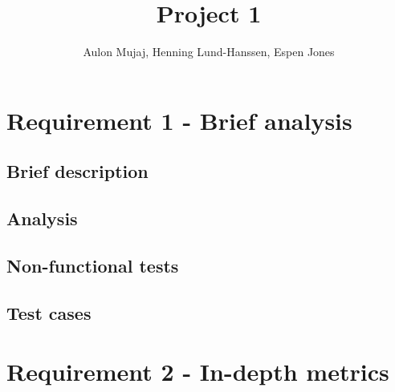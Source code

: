 \documentclass[UKenglish]{article}  %
\title{Project 1}        %
\author{Aulon Mujaj, Henning Lund-Hanssen, Espen Jones}                      %
\begin{document}
\maketitle{}

\section{Requirement 1 - Brief analysis}

\subsection{Brief description}

\subsection{Analysis}

\subsection{Non-functional tests}

\subsection{Test cases}

\section{Requirement 2 - In-depth metrics}
\end{document}
